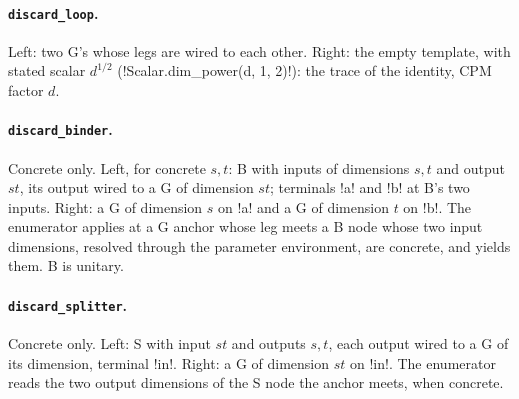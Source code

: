 \paragraph{\texttt{discard\_loop}.} Left: two G's whose legs are wired to each other. Right: the empty template, with stated scalar $d^{1/2}$ (\py!Scalar.dim_power(d, 1, 2)!): the trace of the identity, CPM factor $d$.

\paragraph{\texttt{discard\_binder}.} Concrete only. Left, for concrete $s,t$: B with inputs of dimensions $s,t$ and output $st$, its output wired to a G of dimension $st$; terminals \code!a! and \code!b! at B's two inputs. Right: a G of dimension $s$ on \code!a! and a G of dimension $t$ on \code!b!. The enumerator applies at a G anchor whose leg meets a B node whose two input dimensions, resolved through the parameter environment, are concrete, and yields them. B is unitary.

\paragraph{\texttt{discard\_splitter}.} Concrete only. Left: S with input $st$ and outputs $s,t$, each output wired to a G of its dimension, terminal \code!in!. Right: a G of dimension $st$ on \code!in!. The enumerator reads the two output dimensions of the S node the anchor meets, when concrete.

